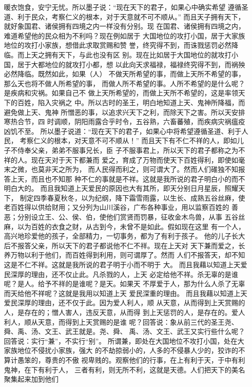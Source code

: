 \documentclass[12pt,UTF8]{ctexbook}
\begin{document}
暖衣饱食，安宁无忧。所以墨子说：“现在天下的君子，如果心中确实希望 
遵循圣道、利于民众，考察仁义的根本，对于天意就不可不顺从。” 
而且天子拥有天下，就好象国君、诸侯拥有四境之内一样没有分别。现 
在国君、诸侯拥有四境之内，难道希望他的民众相为不利吗？现在例如居于 
大国地位的攻打小国，居于大家族地位的攻打小家族，想借此求取赏赐和赞 
誉，终究得不到，而诛戮惩罚必然降临。而上天之拥有天下，与此也没有区 
别。现在比如居于大国地位的就攻打小国，居于大都地位的就攻打小都，想 
以此向天求福禄，福禄终究得不到，而祸殃必然降临。既然如此，如果（人） 
不做天所希望的事，而做上天所不希望的事，那么天也将不做人所希望的事， 
而做人所不希望的事。人所不希望的是什么呢？是疾病和灾祸。如果自己不 
做上天所希望的，而做上天所不希望的，这是率领天下的百姓，陷入灾祸之 
中。所以古时的圣王，明白地知道上天、鬼神所降福，而避免做上天、鬼神 
所憎恶的事，以追求兴天下之利，而除天下之害。所以天安排寒热合节，四 
时调顺，阴阳雨露合乎时令，五谷熟，六畜蕃殖，而疾病灾祸瘟疫凶饥不至。 
所以墨子说道：“现在天下的君子，如果心中将希望遵循圣道、利于人民， 
考察仁义的根本，对天意不可不顺从！” 
而且天下有不仁不祥的人，即如儿子不侍奉父亲，弟弟不服事兄长，臣 
子不服事君上，所以天下的君子都称之为不祥的人。现在天对于天下都兼而 
爱之，育成了万物而使天下百姓得利，即使如毫末之微，也莫非天之所为， 
而人民得而利之，则可谓大了。然而人们碓独不知报答上天，而且也不知那 
种不仁的事就是不祥。这就是我所说的君子明白小的而不明白大的。 
而且我知道上天爱民的原因也大有其所，即天分别日月星辰，照耀天下， 
制定四季春夏秋冬，以为纪纲，降下霜雪雨露，以生长、成熟五谷丝麻，使 
老百姓得以供给财用；又分列为山川溪谷，广布各种事业，用以监察百姓的 
善恶；分别设立王、公、侯、伯，使他们赏贤而罚暴，征收金木鸟兽，从事 
五谷丝麻，以为百姓的衣食之财，从古到今，未曾不是如此。假如现在这里 
有一个人，高兴地珍爱他的孩子，全部精力，一切事务，都为了有利于孩子。 
他的儿子长大后不报答父亲，所以天下的君子都说他不仁不祥。现在上天对 
天下兼而爱之，长养万物以利于他们，而百姓得到利用，则可谓厚了。然而 
人们不报答天，却不知这是不仁不祥。这就是我所说的君子明于小而不明于 
大。 
而且我藉以知道上天爱民深厚的理由，还不仅止此。凡杀戮的人，上天 
必定给他不祥。杀无辜的是谁呢？是人。给予不祥的是谁呢？是天。如果天 
不厚爱于人，那为什么人杀了无辜而天给他不祥呢？这就是我用以知道上天 
爱民深重的理由。 
而且我藉以知道上天爱民深厚的理由，还不仅于此。因为爱人利人，顺 
从天意，从而得到上天赏赐的人，是存在的；憎人害人，违反天意，从而得 
到上天惩罚的人，是存在的。爱人利人，顺从天意，而得到上天赏赐的是谁 
呢？回答说：象从前三代的圣王尧、舜、禹、汤、文王、武王就是。尧、舜、 
禹、汤、文王、武王又实行些什么呢？回答说：实行“兼”，不实行“别”。 
所谓兼，即处在大国地位不攻打小国，处在大家族地位不侵扰小家族，强大 
的不劫掠弱小的，人多的不侵暴人少的，狡诈的不算计愚笨的，尊贵的不傲 
视卑贱的。观察他们的行事，在上有利于天，于中有利鬼神，在下有利于人， 
三者有利，则无所不利，这就是天德。人们把天下的美名聚集起来加到他们 
\end{document}
